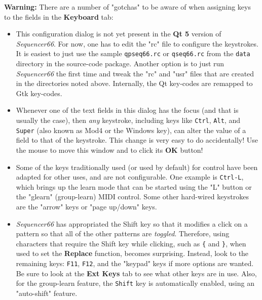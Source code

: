    \textbf{Warning:}
   There are a number of "gotchas" to be aware of when assigning keys to the
   fields in the \textbf{Keyboard} tab:

   \begin{itemize}
      \item This configuration dialog is not yet present in the
         \textbf{Qt 5} version of \textsl{Sequencer66}.  For now,
         one has to edit the "rc" file to configure the keystrokes.
         It is easiest to just use the sample \texttt{qpseq66.rc}
         or \texttt{qseq66.rc} from the
         \texttt{data} directory in the source-code package.
         Another option is to just run \textsl{Sequencer66} the first time and
         tweak the "rc" and "usr" files that are created in the directories
         noted above.
         Internally, the Qt key-codes are remapped to Gtk key-codes.
      \item Whenever one of the text fields in this dialog has the focus (and
         that is usually the case), then
         \textsl{any} keystroke, including keys like
         \texttt{Ctrl},
         \texttt{Alt}, and
         \texttt{Super} (also known as Mod4 or the Windows key),
         can alter the value of a
         field to that of the keystroke.  This change is very easy to do
         accidentally!  \textsf{Use the mouse} to move this window and to click
         its \textbf{OK} button!
      \item Some of the keys traditionally used (or used by default) for
         control have been adapted for other uses, and are not configurable.
         One example is \texttt{Ctrl-L}, which brings up the learn mode
         that can be started using the "L" button or the "glearn"
         (group-learn) MIDI control.
         Some other hard-wired keystrokes are the "arrow" keys or "page
         up/down" keys.
      \item \textsl{Sequencer66} has appropriated the
          Shift key so that it
         modifies a click on a pattern so that all of the other patterns are
         \textsl{toggled}.  Therefore, using characters that require the Shift
         key while clicking, such as \texttt{\{} and \texttt{\}}, when used
         to set the \textbf{Replace} function, becomes surprising.
         Instead, look to the remaining keys: \texttt{F11}, \texttt{F12},
         and the "keypad" keys if more options are wanted.  Be sure to
         look at the \textbf{Ext Keys} tab to see what other keys are in use.
         Also, for the group-learn feature, the \texttt{Shift} key is 
         automatically enabled, using an "auto-shift" feature.
   \end{itemize}

